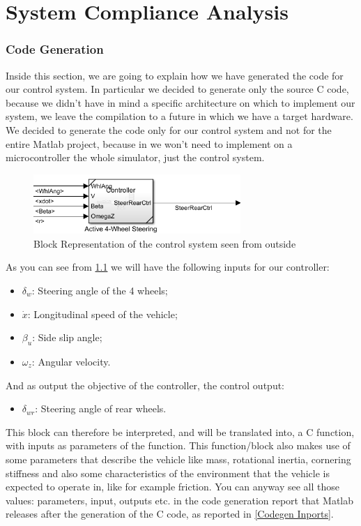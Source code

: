 
\chapter{System Compliance Analysis}



\subsection{Code Generation}
Inside this section, we are going to explain how we have generated the code for our control system. In particular we decided to generate only the source C code, because we didn't have in mind a specific architecture on which to implement our system, we leave the compilation to a future in which we have a target hardware. We decided to generate the code only for our control system and not for the entire Matlab project, because in we won't need to implement on a microcontroller the whole simulator, just the control system. 
\begin{figure} \label{Control Mask}
		\centering
		\includegraphics[width=0.7\textwidth]{Images/Simulator/ctrl-mask}
		\caption{Block Representation of the control system seen from outside}	
\end{figure}
As you can see from \ref{Control Mask} we will have the following inputs for our controller:
\begin{itemize}
\item $\delta_{w}$: Steering angle of the 4 wheels;
\item $\dot{x}$: Longitudinal speed of the vehicle;
\item $\beta_{u}$: Side slip angle;
\item $\omega_{z}$: Angular velocity.
\end{itemize}
And as output the objective of the controller, the control output:
\begin{itemize}
\item $\delta_{wr}$: Steering angle of rear wheels.
\end{itemize}
This block can therefore be interpreted, and will be translated into, a C function, with inputs as parameters of the function. This function/block also makes use of some parameters that describe the vehicle like mass, rotational inertia, cornering stiffness and also some characteristics of the environment that the vehicle is expected to operate in, like for example friction. You can anyway see all those values: parameters, input, outputs etc. in the code generation report that Matlab releases after the generation of the C code, as reported in \ref{Codegen Inports}. 
